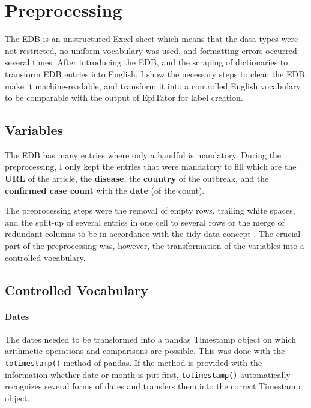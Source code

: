 \section{Preprocessing}\label{preprocessing}
  The EDB is an unstructured Excel sheet which means that the data types were not restricted, no uniform vocabulary was used, and formatting errors occurred several times.
  After introducing the EDB, and the scraping of dictionaries to transform EDB entries into English, I show the necessary steps to clean the EDB, make it machine-readable, and transform it into a controlled English vocabulary to be comparable with the output of EpiTator for label creation.

\subsection{Variables}
  The EDB has many entries where only a handful is mandatory.
  During the preprocessing, I only kept the entries that were mandatory to fill which are
  the \textbf{URL} of the article, the \textbf{disease}, the \textbf{country} of the outbreak, and the \textbf{confirmed case count} with the \textbf{date} (of the count).

  The preprocessing steps were the removal of empty rows, trailing white spaces, and the split-up of several entries in one cell to several rows or the merge of redundant columns to be in accordance with the tidy data concept \citep{Wickham2014}.
  The crucial part of the preprocessing was, however, the transformation of the variables into a controlled vocabulary.

\subsection{Controlled Vocabulary}\label{controlled vocabulary}
  \paragraph{Dates}
    The dates needed to be transformed into a pandas Timestamp object on which arithmetic operations and comparisons are possible.
    This was done with the \texttt{totimestamp()} method of pandas.
    If the method is provided with the information whether date or month is put first, \texttt{totimestamp()} automatically recognizes several forms of dates and transfers them into the correct Timestamp object.

